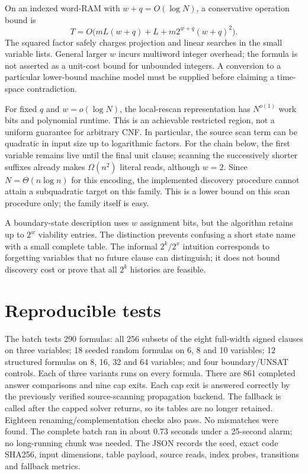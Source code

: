 \documentclass[11pt]{article}
\begin{document}
On an indexed word-RAM with $w+q=O(\log N)$, a conservative operation bound is
\[
 T=O\bigl(mL(w+q)+L+m2^{w+q}(w+q)^2\bigr).
\]
The squared factor safely charges projection and linear searches in the small
variable lists. General larger $w$ incurs multiword integer overhead; the
formula is not asserted as a unit-cost bound for unbounded integers.
A conversion to a particular lower-bound machine model must be supplied
before claiming a time-space contradiction.

For fixed $q$ and $w=o(\log N)$, the local-rescan representation has
$N^{o(1)}$ work bits and polynomial runtime. This is an achievable restricted
region, not a uniform guarantee for arbitrary CNF. In particular, the source
scan term can be quadratic in input size up to logarithmic factors.
For the chain below, the first variable remains live until the final unit
clause; scanning the successively shorter suffixes already makes
$\Omega(n^2)$ literal reads, although $w=2$. Since $N=\Theta(n\log n)$ for
this encoding, the implemented discovery procedure cannot attain a
subquadratic target on this family. This is a lower bound on this scan
procedure only; the family itself is easy.

A boundary-state description uses $w$ assignment bits, but the algorithm
retains up to $2^w$ viability entries. The distinction prevents confusing a
short state name with a small complete table. The informal $2^k/2^x$ intuition
corresponds to forgetting variables that no future clause can distinguish;
it does not bound discovery cost or prove that all $2^k$ histories are feasible.

\section{Reproducible tests}
The batch tests 290 formulas: all 256 subsets of the eight full-width signed
clauses on three variables; 18 seeded random formulas on 6, 8 and 10 variables;
12 structured formulas on 8, 16, 32 and 64 variables; and four boundary/UNSAT
controls. Each of three variants runs on every formula.
There are 861 completed answer comparisons and nine cap exits. Each cap exit
is answered correctly by the previously verified source-scanning propagation
backend. The fallback is called after the capped solver returns, so its tables
are no longer retained. Eighteen renaming/complementation checks also pass.
No mismatches were found. The complete batch ran in about 0.73 seconds under
a 25-second alarm; no long-running chunk was needed. The JSON records the
seed, exact code SHA256, input dimensions, table payload, source reads,
index probes, transitions and fallback metrics.
\end{document}
